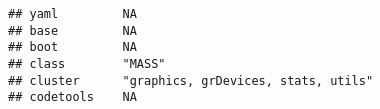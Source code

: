 \documentclass[]{book}
\begin{document}
\begin{verbatim}
## yaml         NA                                                                                                                                                                                                                                                                                                                                                                                                                                                                                                          
## base         NA                                                                                                                                                                                                                                                                                                                                                                                                                                                                                                          
## boot         NA                                                                                                                                                                                                                                                                                                                                                                                                                                                                                                          
## class        "MASS"                                                                                                                                                                                                                                                                                                                                                                                                                                                                                                      
## cluster      "graphics, grDevices, stats, utils"                                                                                                                                                                                                                                                                                                                                                                                                                                                                         
## codetools    NA                                                                                                                                                                                                                                                                                                                                                                                                                                                                                                          

\end{verbatim}
\end{document}
